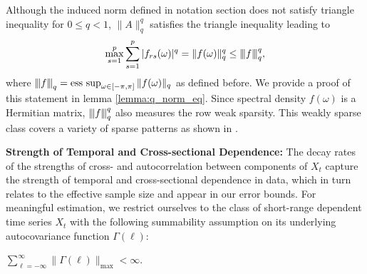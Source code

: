 Although the induced norm defined in notation section does not satisfy triangle inequality for $0\le q<1$, $\|A\|_q^q$ satisfies the triangle inequality leading to 
\vspace{-0.1in}
\begin{equation}
\max_{s=1}^p \sum_{s=1}^p |f_{rs}(\omega)|^q = \|f(\omega)\|_q^q  \le {\left\vert\kern-0.25ex\left\vert\kern-0.25ex\left\vert f \right\vert\kern-0.25ex\right\vert\kern-0.25ex\right\vert}_q^q, \nonumber
\end{equation}
where $\vertiii{f}_q = \esssup_{\omega\in [-\pi, \pi]} \|f(\omega)\|_q$ as defined before. 
We provide a proof of this statement in lemma   \ref{lemma:q_norm_eq}. 
Since spectral density $f(\omega)$ is a Hermitian matrix, ${\left\vert\kern-0.25ex\left\vert\kern-0.25ex\left\vert f \right\vert\kern-0.25ex\right\vert\kern-0.25ex\right\vert}_q^q$ also measures the row weak sparsity. This weakly sparse class covers a  variety of sparse patterns as shown in \citet{bickel2008covariance}. 

\smallskip
\noindent \textbf{Strength of Temporal and Cross-sectional Dependence: } %
The decay rates of the strengths of cross- and autocorrelation between components of $X_t$ capture the strength of temporal and cross-sectional dependence in data, which in turn relates to the effective sample size and appear in our error bounds. For meaningful estimation, we restrict ourselves to the class of short-range dependent time series $X_t$ with  the following summability assumption on its underlying autocovariance function $\Gamma(\ell)$:
\begin{assumption}\label{assumption:finite_auto}
$\sum_{\ell=-\infty}^\infty \|\Gamma(\ell)\|_{\text{max}}<\infty$. 
\end{assumption}

